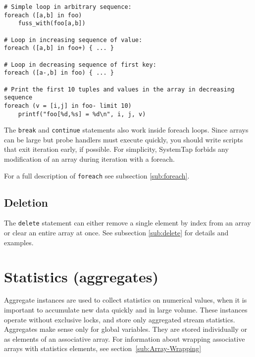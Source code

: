 \documentclass[twoside,english]{article}
\newenvironment{vindent}
{\begin{list}{}{\setlength{\listparindent}{6pt}}
\item[]}
{\end{list}}
\begin{document}
\begin{vindent}
\begin{verbatim}
# Simple loop in arbitrary sequence:
foreach ([a,b] in foo)
    fuss_with(foo[a,b])

# Loop in increasing sequence of value:
foreach ([a,b] in foo+) { ... }

# Loop in decreasing sequence of first key:
foreach ([a-,b] in foo) { ... }

# Print the first 10 tuples and values in the array in decreasing sequence
foreach (v = [i,j] in foo- limit 10)
    printf("foo[%d,%s] = %d\n", i, j, v)
\end{verbatim}
\end{vindent}
The \texttt{break} and \texttt{continue} statements also work inside foreach
loops. Since arrays can be large but probe handlers must execute quickly,
you should write scripts that exit iteration early, if possible. For simplicity,
SystemTap forbids any modification of an array during iteration with a foreach.

For a full description of \texttt{foreach} see subsection \ref{sub:foreach}.

\subsection{Deletion}
The \texttt{delete} statement can either remove a single element by index from
an array or clear an entire array at once.  See subsection \ref{sub:delete} for
details and examples.

\section{Statistics (aggregates)\label{sec:Statistics}}
Aggregate instances are used to collect statistics on numerical values, when
it is important to accumulate new data quickly and in large volume. These
instances operate without exclusive locks, and store only aggregated stream
statistics. Aggregates make sense only for global variables. They are stored
individually or as elements of an associative array. For information about 
wrapping associative arrays with statistics elements, see section~\ref{sub:Array-Wrapping}
\end{document}

